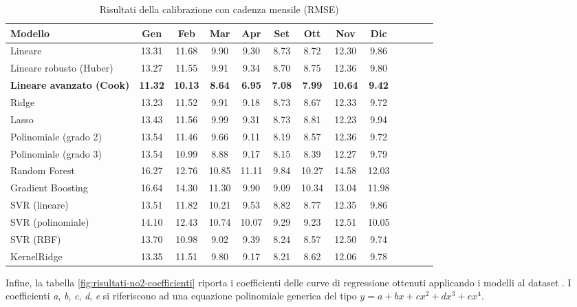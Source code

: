 \begin{table}[H]
    \footnotesize
    \centering
    \def\arraystretch{0.95}
    \setlength{\tabcolsep}{5pt}
    \begin{tabular}{|l|c|c|c|c|c|c|c|c|c|c|c|c|}
    \hline
        \textbf{Modello} & \textbf{Gen} & \textbf{Feb} & \textbf{Mar} & \textbf{Apr} & \textbf{Set} & \textbf{Ott} & \textbf{Nov} & \textbf{Dic} \\ \hline
        Lineare & 13.31 & 11.68 & 9.90 & 9.30 & 8.73 & 8.72 & 12.30 & 9.86 \\ \hline
        Lineare robusto (Huber) & 13.27 & 11.55 & 9.91 & 9.34 & 8.70 & 8.75 & 12.36 & 9.80 \\ \hline
        \textbf{Lineare avanzato (Cook)} & \textbf{11.32} & \textbf{10.13} & \textbf{8.64} & \textbf{6.95} & \textbf{7.08} & \textbf{7.99} & \textbf{10.64} & \textbf{9.42} \\ \hline
        Ridge & 13.23 & 11.52 & 9.91 & 9.18 & 8.73 & 8.67 & 12.33 & 9.72 \\ \hline
        Lasso & 13.43 & 11.56 & 9.99 & 9.31 & 8.73 & 8.81 & 12.23 & 9.94 \\ \hline
        Polinomiale (grado 2) & 13.54 & 11.46 & 9.66 & 9.11 & 8.19 & 8.57 & 12.36 & 9.72 \\ \hline
        Polinomiale (grado 3) & 13.54 & 10.99 & 8.88 & 9.17 & 8.15 & 8.39 & 12.27 & 9.79 \\ \hline
        Random Forest & 16.27 & 12.76 & 10.85 & 11.11 & 9.84 & 10.27 & 14.58 & 12.03 \\ \hline
        Gradient Boosting & 16.64 & 14.30 & 11.30 & 9.90 & 9.09 & 10.34 & 13.04 & 11.98 \\ \hline
        SVR (lineare) & 13.51 & 11.82 & 10.21 & 9.53 & 8.82 & 8.77 & 12.35 & 9.86 \\ \hline
        SVR (polinomiale) & 14.10 & 12.43 & 10.74 & 10.07 & 9.29 & 9.23 & 12.51 & 10.05 \\ \hline
        SVR (RBF) & 13.70 & 10.98 & 9.02 & 9.39 & 8.24 & 8.57 & 12.50 & 9.74 \\ \hline
        KernelRidge & 13.35 & 11.51 & 9.80 & 9.17 & 8.21 & 8.62 & 12.06 & 9.78 \\ \hline
    \end{tabular}
    \captionsetup{justification=centering}
    \caption{Risultati della calibrazione  con cadenza mensile (RMSE)}
    \label{fig:risultati-no2-rmse-mese}
\end{table}

Infine, la tabella \ref{fig:risultati-no2-coefficienti} riporta i coefficienti delle curve di regressione ottenuti applicando i modelli al dataset . I coefficienti \textit{a}, \textit{b}, \textit{c}, \textit{d}, \textit{e} si riferiscono ad una equazione polinomiale generica del tipo $y=a+bx+cx^2+dx^3+ex^4$.

